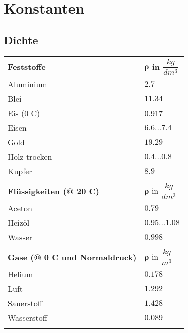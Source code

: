 
\newpage
\section{Konstanten}
	\subsection{Dichte}
		\begin{tabular}{| p{6cm} | p{5cm} |}
			\hline
			\rowcolor{Gray}
			\textbf{Feststoffe}	&	$\boldsymbol{\rho}$ in $\dfrac{kg}{dm^3}$\\
			\hline
			Aluminium & $2.7$\\
			Blei & $11.34$\\
			Eis (0 \textdegree C) & 0.917\\
			Eisen & $6.6...7.4$\\
			Gold & $19.29$\\
			Holz trocken & $0.4...0.8$\\
			Kupfer & $8.9$\\
			& \\
			\hline
			\rowcolor{Gray}
			\textbf{Flüssigkeiten (@ 20 \textdegree C)} & $\boldsymbol{\rho}$ in $\dfrac{kg}{dm^3}$\\
			\hline
			Aceton & $0.79$\\
			Heizöl & $0.95...1.08$\\
			Wasser & $0.998$\\
			& \\
			\hline
			\rowcolor{Gray}
			\textbf{Gase (@ 0 \textdegree C und Normaldruck)}	&	$\boldsymbol{\rho}$ in $\dfrac{kg}{m^3}$\\
			\hline
			Helium & $0.178$\\
			Luft & $1.292$\\
			Sauerstoff & $1.428$\\
			Wasserstoff & $0.089$\\
			& \\
			\hline
		\end{tabular}
	
